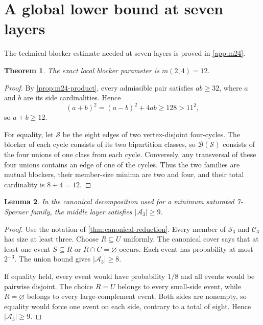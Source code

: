 \documentclass[11pt]{article}
\newtheorem{theorem}{Theorem}[section]
\newtheorem{lemma}[theorem]{Lemma}
\theoremstyle{definition}
\theoremstyle{remark}
\newcommand{\blocker}{\mathcal{B}}
\begin{document}
\section{A global lower bound at seven layers}
\label{sec:sat7-lower}

The technical blocker estimate needed at seven layers is proved in
\cref{app:m24}.

\begin{theorem}
\label{thm:m24}
The exact local blocker parameter is $m(2,4)=12$.
\end{theorem}

\begin{proof}
By \cref{prop:m24-product}, every admissible pair satisfies
$ab\geq32$, where $a$ and $b$ are its side cardinalities.  Hence
\[
  (a+b)^2=(a-b)^2+4ab\geq128>11^2,
\]
so $a+b\geq12$.

For equality, let $\mathcal S$ be the eight edges of two vertex-disjoint
four-cycles.  The blocker of each cycle consists of its two bipartition
classes, so $\blocker(\mathcal S)$ consists of the four unions of one class
from each cycle.  Conversely, any transversal of these four unions contains
an edge of one of the cycles.  Thus the two families are mutual blockers,
their member-size minima are two and four, and their total cardinality is
$8+4=12$.
\end{proof}

\begin{lemma}
\label{lem:middle-nine}
In the canonical decomposition used for a minimum saturated 7-Sperner
family, the middle layer satisfies $|\mathcal A_3|\geq9$.
\end{lemma}

\begin{proof}
Use the notation of \cref{thm:canonical-reduction}.  Every member of
$\mathcal S_3$ and $\mathcal C_3$ has size at least three.  Choose
$R\subseteq U$ uniformly.  The canonical cover says that at least one event
$S\subseteq R$ or $R\cap C=\varnothing$ occurs.  Each event has probability
at most $2^{-3}$.  The union bound gives
$|\mathcal A_3|\geq8$.

If equality held, every event would have probability $1/8$ and all events
would be pairwise disjoint.  The choice $R=U$ belongs to every small-side
event, while $R=\varnothing$ belongs to every large-complement event.  Both
sides are nonempty, so equality would force one event on each side, contrary
to a total of eight.  Hence $|\mathcal A_3|\geq9$.
\end{proof}
\end{document}
